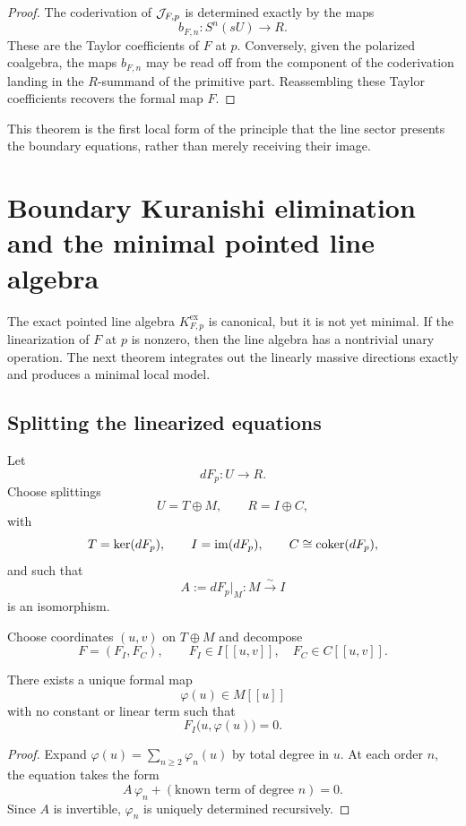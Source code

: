 \begin{proof}
The coderivation of $\mathcal J_{F,p}$ is determined exactly by the maps
\[
b_{F,n}:S^n(sU)\to R.
\]
These are the Taylor coefficients of $F$ at $p$. Conversely, given the polarized coalgebra, the maps $b_{F,n}$ may be read off from the component of the coderivation landing in the $R$-summand of the primitive part. Reassembling these Taylor coefficients recovers the formal map $F$.
\end{proof}

\begin{remark}
This theorem is the first local form of the principle that the line sector presents the boundary equations, rather than merely receiving their image.
\end{remark}


\section{Boundary Kuranishi elimination and the minimal pointed line algebra}%

The exact pointed line algebra $K_{F,p}^{\mathrm{ex}}$ is canonical, but it is not yet minimal. If the linearization of $F$ at $p$ is nonzero, then the line algebra has a nontrivial unary operation. The next theorem integrates out the linearly massive directions exactly and produces a minimal local model.

\subsection{Splitting the linearized equations}

Let
\[
dF_p:U\to R.
\]
Choose splittings
\[
U=T\oplus M,
\qquad
R=I\oplus C,
\]
with
\[
T=\ker(dF_p),
\qquad
I=\operatorname{im}(dF_p),
\qquad
C\cong \operatorname{coker}(dF_p),
\]
and such that
\[
A:=dF_p|_M:M\xrightarrow{\sim} I
\]
is an isomorphism.

Choose coordinates $(u,v)$ on $T\oplus M$ and decompose
\[
F=(F_I,F_C),
\qquad
F_I\in I[[u,v]],
\quad
F_C\in C[[u,v]].
\]

\begin{lemma}%
There exists a unique formal map
\[
\varphi(u)\in M[[u]]
\]
with no constant or linear term such that
\[
F_I\bigl(u,\varphi(u)\bigr)=0.
\]
\end{lemma}

\begin{proof}
Expand $\varphi(u)=\sum_{n\ge 2}\varphi_n(u)$ by total degree in $u$. At each order $n$, the equation takes the form
\[
A\,\varphi_n + (\text{known term of degree }n)=0.
\]
Since $A$ is invertible, $\varphi_n$ is uniquely determined recursively.
\end{proof}

